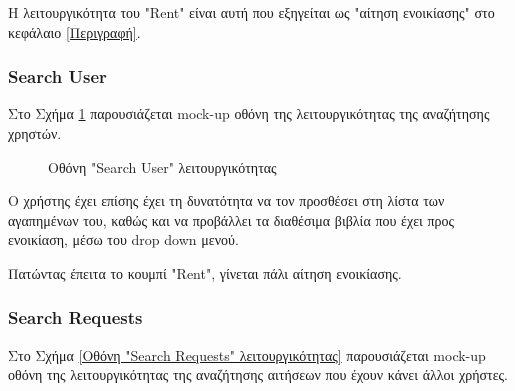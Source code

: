 \documentclass[12pt,a4paper]{article}
\begin{document}
Η λειτουργικότητα του "Rent" είναι αυτή που εξηγείται ως "αίτηση ενοικίασης" στο κεφάλαιο \ref{Περιγραφή}.

\subsubsection{Search User}

Στο Σχήμα \ref{Οθόνη "Search User" λειτουργικότητας} παρουσιάζεται mock-up οθόνη της λειτουργικότητας της αναζήτησης χρηστών.

\begin{figure}[H]
	\caption{Οθόνη "Search User" λειτουργικότητας}
	\label{Οθόνη "Search User" λειτουργικότητας}
\end{figure}

Ο χρήστης έχει επίσης έχει τη δυνατότητα να τον προσθέσει στη λίστα των αγαπημένων του, καθώς και να προβάλλει τα διαθέσιμα βιβλία που έχει προς ενοικίαση, μέσω του drop down μενού. 

Πατώντας έπειτα το κουμπί "Rent", γίνεται πάλι αίτηση ενοικίασης.

\subsubsection{Search Requests}

Στο Σχήμα \ref{Οθόνη "Search Requests" λειτουργικότητας} παρουσιάζεται mock-up οθόνη της λειτουργικότητας της αναζήτησης αιτήσεων που έχουν κάνει άλλοι χρήστες.
\end{document}
